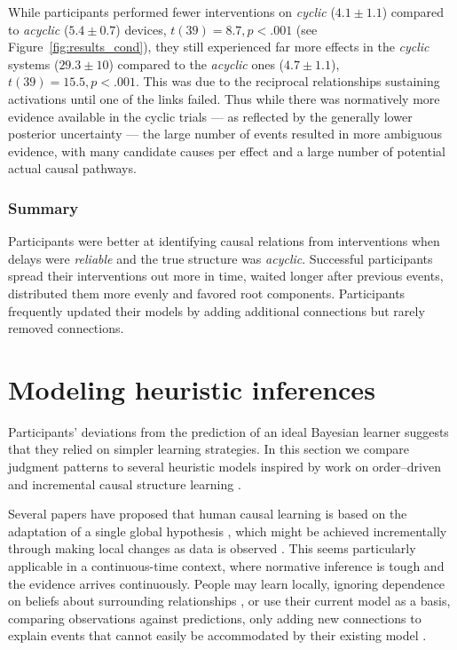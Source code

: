 \documentclass[10pt,letterpaper]{article}
\begin{document}
While participants performed fewer interventions on  \emph{cyclic} ($4.1\pm1.1$) compared to \emph{acyclic} ($5.4\pm0.7$) devices, $t(39) = 8.7, p <.001$ (see Figure~\ref{fig:results_cond}), they still experienced far more effects in the \emph{cyclic} systems ($29.3\pm10$) compared to the \emph{acyclic} ones ($4.7\pm1.1$), $t(39) = 15.5, p<.001$.  This was due to the reciprocal relationships sustaining activations until one of the links failed.  Thus while there was normatively more evidence available in the cyclic trials --- as reflected by the generally lower posterior uncertainty --- the large number of events resulted in more ambiguous evidence, with many candidate causes per effect and a large number of potential actual causal pathways.


\subsubsection{Summary}

Participants were better at identifying causal relations from interventions when delays were \emph{reliable} and the true structure was \emph{acyclic}.  
Successful participants spread their interventions out more in time, waited longer after previous events, distributed them more evenly and favored root components.    
Participants frequently updated their models by adding additional connections but rarely removed connections.

\section{Modeling heuristic inferences}

Participants' deviations from the prediction of an ideal Bayesian learner suggests that they relied on simpler learning strategies. In this section we compare judgment patterns to several heuristic models inspired by work on order--driven \citep[e.g.,][]{bramley2014order,mccormack2015temporal} and incremental causal structure learning \citep[e.g.,][]{bonawitz2014win, bramley2017neurath}.

Several papers have proposed that human causal learning is based on the adaptation of a single global hypothesis \citep{bonawitz2014win}, which might be achieved incrementally through making local changes as data is observed \citep{bramley2017neurath}. This seems particularly applicable in a continuous-time context, where normative inference is tough and the evidence arrives continuously.  People may learn locally, ignoring dependence on beliefs about surrounding relationships \citep[e.g.][]{fernbach2009causal}, or use their current model as a basis, comparing observations against predictions, only adding new connections to explain events that cannot easily be accommodated by their existing model \citep{bramley2017neurath}.
\end{document}
